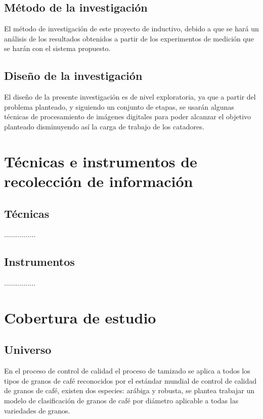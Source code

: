 \subsection{Método de la investigación}
El método de investigación de este proyecto de inductivo, debido a que se hará un análisis de los resultados obtenidos a partir de los experimentos de medición que se harán con el sistema propuesto.

\subsection{Diseño de la investigación}
El diseño de la presente investigación es de nivel exploratoria, ya que a partir del problema planteado, y siguiendo un conjunto de etapas, se usarán algunas técnicas de procesamiento de imágenes digitales para poder alcanzar el objetivo planteado disminuyendo así la carga de trabajo de los catadores.


\section{Técnicas e instrumentos de recolección de información}

\subsection{Técnicas}
................

\subsection{Instrumentos}
................


\section{Cobertura de estudio}

\subsection{Universo}
En el proceso de control de calidad el proceso de tamizado se aplica a todos los tipos de granos de café reconocidos por el estándar mundial de control de calidad de granos de café,  existen dos especies: arábiga y robusta, se plantea trabajar un modelo de clasificación de granos de café por diámetro aplicable a todas las variedades de granos.

